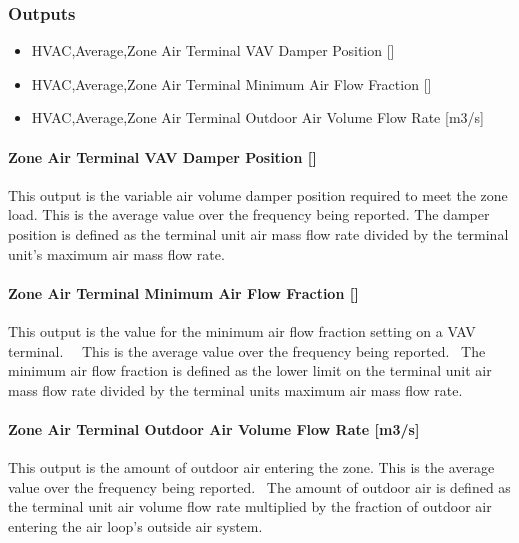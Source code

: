 \subsubsection{Outputs}\label{outputs-2-000}

\begin{itemize}
\item
  HVAC,Average,Zone Air Terminal VAV Damper Position {[]}
\item
  HVAC,Average,Zone Air Terminal Minimum Air Flow Fraction {[]}
\item
  HVAC,Average,Zone Air Terminal Outdoor Air Volume Flow Rate {[}m3/s{]}
\end{itemize}

\paragraph{Zone Air Terminal VAV Damper Position {[]}}\label{zone-air-terminal-vav-damper-position}

This output is the variable air volume damper position required to meet the zone load. This is the average value over the frequency being reported. The damper position is defined as the terminal unit air mass flow rate divided by the terminal unit's maximum air mass flow rate.

\paragraph{Zone Air Terminal Minimum Air Flow Fraction {[]}}\label{zone-air-terminal-minimum-air-flow-fraction}

This output is the value for the minimum air flow fraction setting on a VAV terminal.~~ This is the average value over the frequency being reported.~ The minimum air flow fraction is defined as the lower limit on the terminal unit air mass flow rate divided by the terminal units maximum air mass flow rate.

\paragraph{Zone Air Terminal Outdoor Air Volume Flow Rate {[}m3/s{]}}\label{zone-air-terminal-outdoor-air-volume-flow-rate-m3s}

This output is the amount of outdoor air entering the zone. This is the average value over the frequency being reported.~ The amount of outdoor air is defined as the terminal unit air volume flow rate multiplied by the fraction of outdoor air entering the air loop's outside air system.

